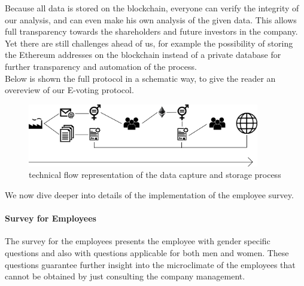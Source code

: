 Because all data is stored on the blockchain, everyone can verify the integrity of our analysis, and can even make his own analysis of the given data. This allows full transparency towards the shareholders and future investors in the company.\\

Yet there are still challenges ahead of us, for example the possibility of storing the Ethereum addresses on the blockchain instead of a private database for further transparency and automation of the process.\\

Below is shown the full protocol in a schematic way, to give the reader an overeview of our E-voting protocol.
\begin{figure}[H]
	\includegraphics[width=0.9\textwidth]{Bilder/Survey_Protocol_preview_2}
	\caption{technical flow representation of the data capture and storage process}
	\label{technical_flow_representation}
\end{figure}


We now dive deeper into details of the implementation of the employee survey.


\paragraph*{Survey for Employees}
The survey for the employees presents the employee with gender specific questions and also with questions applicable for both men and women. These questions guarantee further insight into the microclimate of the employees that cannot be obtained by just consulting the company management.\\


